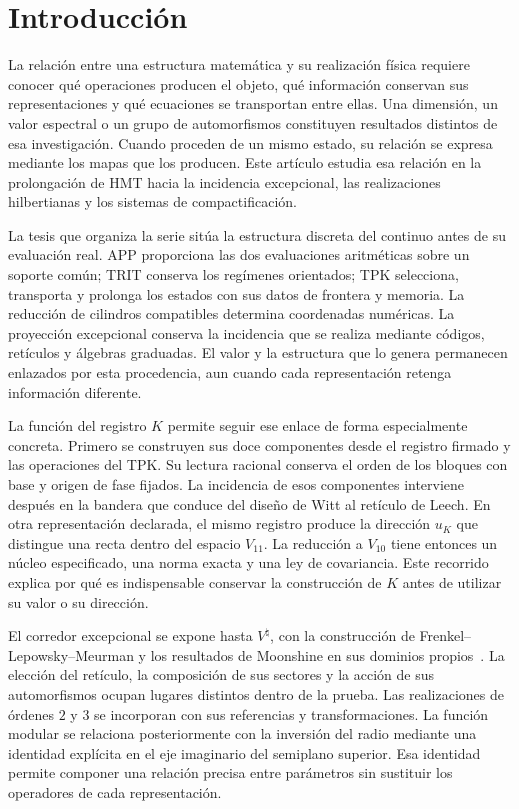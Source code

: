 \section{Introducción}
\label{iv:introduccion}

La relación entre una estructura matemática y su realización física
requiere conocer qué operaciones producen el objeto, qué información
conservan sus representaciones y qué ecuaciones se transportan entre
ellas. Una dimensión, un valor espectral o un grupo de automorfismos
constituyen resultados distintos de esa investigación. Cuando proceden
de un mismo estado, su relación se expresa mediante los mapas que los
producen. Este artículo estudia esa relación en la prolongación de HMT
hacia la incidencia excepcional, las realizaciones hilbertianas y los
sistemas de compactificación.

La tesis que organiza la serie sitúa la estructura discreta del continuo
antes de su evaluación real. APP proporciona las dos evaluaciones
aritméticas sobre un soporte común; TRIT conserva los regímenes
orientados; TPK selecciona, transporta y prolonga los estados con sus
datos de frontera y memoria. La reducción de cilindros compatibles
determina coordenadas numéricas. La proyección excepcional conserva la
incidencia que se realiza mediante códigos, retículos y álgebras
graduadas. El valor y la estructura que lo genera permanecen enlazados
por esta procedencia, aun cuando cada representación retenga información
diferente.

La función del registro \(K\) permite seguir ese enlace de forma
especialmente concreta. Primero se construyen sus doce componentes
desde el registro firmado y las operaciones del TPK. Su lectura
racional conserva el orden de los bloques con base y origen de fase
fijados. La incidencia de esos componentes interviene después en la
bandera que conduce del diseño de Witt al retículo de Leech.
En otra representación declarada, el mismo registro produce la
dirección \(u_K\) que distingue una recta dentro del espacio
\(V_{11}\). La reducción a \(V_{10}\) tiene entonces un núcleo
especificado, una norma exacta y una ley de covariancia. Este recorrido
explica por qué es indispensable conservar la construcción de \(K\)
antes de utilizar su valor o su dirección.

El corredor excepcional se expone hasta \(V^\natural\), con la
construcción de Frenkel--Lepowsky--Meurman y los resultados de Moonshine
en sus dominios propios~\cite{flm,borcherds}. La elección del retículo,
la composición de sus sectores y la acción de sus automorfismos ocupan
lugares distintos dentro de la prueba. Las realizaciones de órdenes
\(2\) y \(3\) se incorporan con sus referencias y transformaciones.
La función modular se relaciona posteriormente con la inversión del
radio mediante una identidad explícita en el eje imaginario del
semiplano superior. Esa identidad permite componer una relación precisa
entre parámetros sin sustituir los operadores de cada representación.

